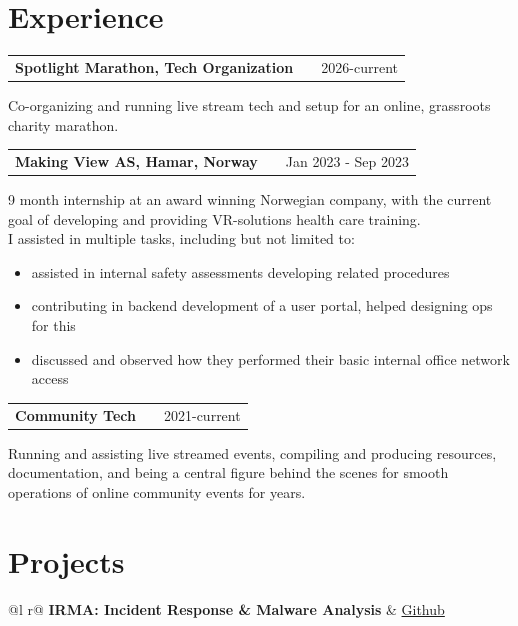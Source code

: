 \documentclass[a4paper,12pt]{article}
\makeatletter
\newenvironment{jobshort}[2]
    {
    \begin{tabularx}{\linewidth}{@{}l X r@{}}
    \textbf{#1} & \hfill &  #2 \\[3.75pt]
    \end{tabularx}
    }
    {
    }
\makeatother
\begin{document}
\section{Experience}

\begin{jobshort}{Spotlight Marathon, Tech Organization}{2026-current}
    Co-organizing and running live stream tech and setup for an online, grassroots charity marathon.
\end{jobshort}

\begin{jobshort}{Making View AS, Hamar, Norway}{Jan 2023 - Sep 2023}
9 month internship at an award winning Norwegian company, with the current goal of developing and providing VR-solutions health care training. \\
I assisted in multiple tasks, including but not limited to: 
\begin{itemize}
    \item assisted in internal safety assessments developing related procedures 
    \item contributing in backend development of a user portal, helped designing ops for this
    \item discussed and observed how they performed their basic internal office network access
\end{itemize}

\end{jobshort}

\begin{jobshort}{Community Tech}{2021-current}
    Running and assisting live streamed events, compiling and producing resources, documentation, and being a central figure behind the scenes for smooth operations of online community events for years.
\end{jobshort}



\section{Projects}

\begin{tabularx}{\linewidth}{ @{}l r@{} }
\textbf{IRMA: Incident Response \& Malware Analysis} & \hfill \href{https://github.com/cenyaae/bach-kmno}{Github} \\[3.75pt]
  \\
\end{tabularx}
\end{document}
